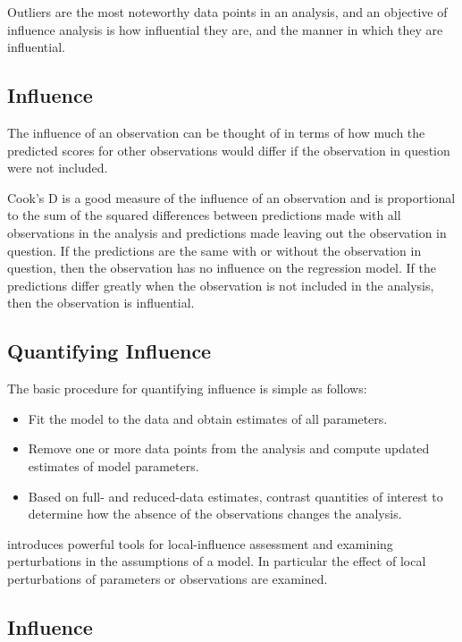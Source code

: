 \documentclass[12pt, a4paper]{article}
\begin{document}
Outliers are the most noteworthy data points in an analysis, and an objective of influence analysis is how influential they are,
and the manner in which they are influential.

			
\subsection{Influence}
The influence of an observation can be thought of in terms of how much the predicted scores for other observations would differ if the observation in question were not included. 
			
Cook's D is a good measure of the influence of an observation and is proportional to the sum of the squared differences between predictions made with all observations in the analysis and predictions made leaving out the observation in question. If the predictions are the same with or without the observation in question, then the observation has no influence on the regression model. If the predictions differ greatly when the observation is not included in the analysis, then the observation is influential.
			
\subsection{Quantifying Influence}  %


The basic procedure for quantifying influence is simple as follows:


\begin{itemize}
	\item Fit the model to the data and obtain estimates of all parameters.
	\item Remove one or more data points from the analysis and compute updated estimates of model parameters.
	\item Based on full- and reduced-data estimates, contrast quantities of interest to determine how the absence of the observations changes the analysis.
\end{itemize}


\citet{cook86} introduces powerful tools for local-influence assessment and examining perturbations in the assumptions of a model. In particular the effect of local perturbations of parameters or observations are examined.




	\subsection{Influence}
\end{document}
